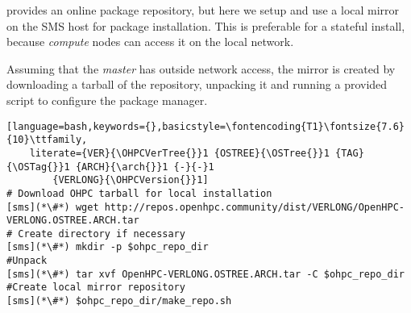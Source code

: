 \OHPC{} provides an online package repository, but here we setup and use a local
mirror on the SMS host for \OHPC{} package installation. This is preferable for
a stateful install, because {\em compute} nodes can access it on the local
network.


Assuming that the {\em master} has outside network access, the mirror is
created  by downloading a tarball of the repository, unpacking it and running a
provided script to configure the package manager.

\begin{lstlisting}[language=bash,keywords={},basicstyle=\fontencoding{T1}\fontsize{7.6}{10}\ttfamily,
	literate={VER}{\OHPCVerTree{}}1 {OSTREE}{\OSTree{}}1 {TAG}{\OSTag{}}1 {ARCH}{\arch{}}1 {-}{-}1
        {VERLONG}{\OHPCVersion{}}1]
# Download OHPC tarball for local installation
[sms](*\#*) wget http://repos.openhpc.community/dist/VERLONG/OpenHPC-VERLONG.OSTREE.ARCH.tar
# Create directory if necessary
[sms](*\#*) mkdir -p $ohpc_repo_dir
#Unpack
[sms](*\#*) tar xvf OpenHPC-VERLONG.OSTREE.ARCH.tar -C $ohpc_repo_dir
#Create local mirror repository
[sms](*\#*) $ohpc_repo_dir/make_repo.sh
\end{lstlisting}
